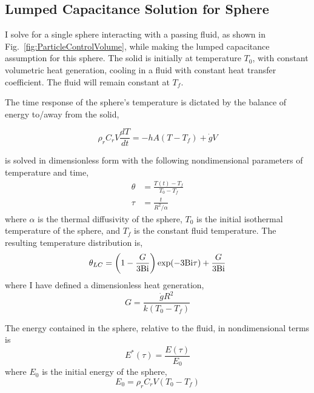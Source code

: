 \subsection{Lumped Capacitance Solution for Sphere}\label{sec:lumped-capacitance}
I solve for a single sphere interacting with a passing fluid, as shown in Fig.~\ref{fig:ParticleControlVolume}, while making the lumped capacitance assumption for this sphere. The solid is initially at temperature $T_0$, with constant volumetric heat generation, cooling in a fluid with constant heat transfer coefficient. The fluid will remain constant at $T_f$.

The time response of the sphere's temperature is dictated by the balance of energy to/away from the solid,  

\begin{equation}\label{eq:lc-energy-balance}
	\rho_rC_rV\frac{dT}{dt} = -hA(T-T_f) + \dot{g}V
\end{equation}

 is solved in dimensionless form with the following nondimensional parameters of temperature and time,
\begin{subequations}
\begin{align}
    \theta &= \frac{T(t) - T_f}{T_0 - T_f}\\
    \tau & = \frac{t}{R^2/\alpha}
\end{align}
\end{subequations}
where $\alpha$ is the thermal diffusivity of the sphere, $T_0$ is the initial isothermal temperature of the sphere, and $T_f$ is the constant fluid temperature. The resulting temperature distribution is,
\begin{equation}
\label{eq:theta-lc}
	\theta_{LC}=\left(1-\frac{G}{3\mathrm{Bi}}\right)\exp(-3\mathrm{Bi} \tau) + \frac{G}{3\mathrm{Bi}}
\end{equation}
where I have defined a dimensionless heat generation,
\begin{equation}\label{eq:nondimensional-heat-generation}
	G = \frac{\dot{g}R^2}{k(T_0 - T_f)}
\end{equation}

The energy contained in the sphere, relative to the fluid, in nondimensional terms is 
\begin{equation}
    E^*(\tau)=\frac{E(\tau)}{E_0}
\end{equation}
where $E_0$ is the initial energy of the sphere,
\begin{equation}
    E_0=\rho_rC_rV(T_0-T_f)
\end{equation}

